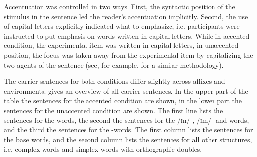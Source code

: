 Accentuation was controlled in two ways. First, the syntactic position of the stimulus in the sentence led the reader's accentuation implicitly. Second, the use of capital letters explicitly indicated what to emphasize,  i.e. participants were instructed to put emphasis on words written in capital letters. While in accented condition, the experimental item was written in capital letters, in unaccented position, the focus was taken away from the experimental item by capitalizing  the two agents of the sentence (see, for example, \cite{Plag.2011} for a similar methodology).


The carrier sentences for both conditions differ slightly across affixes and environments.  gives an overview of all carrier sentences. In the upper part of the table the sentences for the accented condition are shown, in the lower part the sentences for the unaccented condition are shown. 
The first line lists the sentences for the words, the second the sentences for the /ɪn/-, /ɪm/- and words, and the third the sentences for the -words.
The first column lists the sentences for the base words, and the second column lists the sentences for all other structures, i.e. complex words and simplex words with orthographic doubles. 




